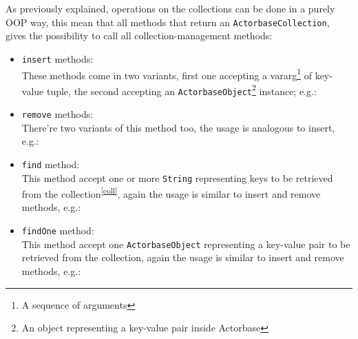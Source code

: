 \documentclass{scalatekids-article}
\begin{document}
As previously explained, operations on the collections can be done in a purely
OOP way, this mean that all methods that return an \verb=ActorbaseCollection=,
gives the possibility to call all collection-management methods:
\begin{itemize}
\item \verb=insert= methods:\\ These methods come in two variants, first one accepting
  a vararg\footnote{A sequence of arguments} of key-value tuple, the second
  accepting an
  \verb=ActorbaseObject=\footnote{An object representing a key-value pair inside Actorbase} instance;
  e.g.:
\item \verb=remove= methods:\\ There're two variants of this method too, the usage is
  analogous to insert, e.g.:
\item \verb=find= method:\\ This method accept one or more \verb=String= representing
  keys to be retrieved from the collection\textsuperscript{\ref{coll}}, again the usage is similar to insert and
  remove methods, e.g.:
\item \verb=findOne= method:\\ This method accept one \verb=ActorbaseObject= representing
  a key-value pair to be retrieved from the collection, again the usage is similar to insert and
  remove methods, e.g.:

\end{itemize}
\end{document}
